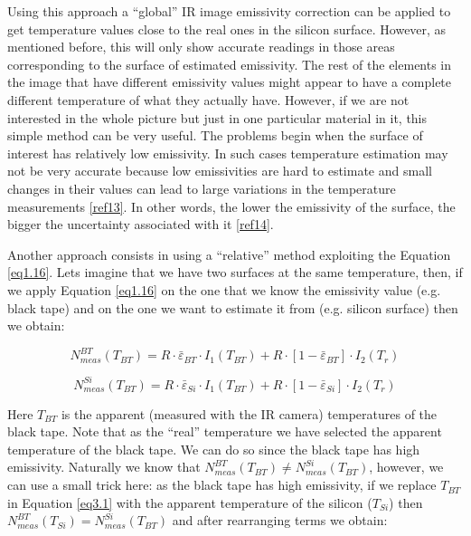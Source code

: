 		Using this approach a “global” IR image emissivity correction can be applied to get temperature values close to the real ones in the silicon surface. However, as mentioned before, this will only show accurate readings in those areas corresponding to the surface of estimated emissivity. The rest of the elements in the image that have different emissivity values might appear to have a complete different temperature of what they actually have. However, if we are not interested in the whole picture but just in one particular material in it, this simple method can be very useful. The problems begin when the surface of interest has relatively low emissivity. In such cases temperature estimation may not be very accurate because low emissivities are hard to estimate and small changes in their values can lead to large variations in the temperature measurements \ref{ref13}. In other words, the lower the emissivity of the surface, the bigger the uncertainty associated with it \ref{ref14}.
		
		Another approach consists in using a “relative” method exploiting the Equation \ref{eq1.16}. Lets imagine that we have two surfaces at the same temperature, then, if we apply Equation \ref{eq1.16} on the one that we know the emissivity value (e.g. black tape) and on the one we want to estimate it from (e.g. silicon surface) then we obtain:
		
		\begin{equation}\label{eq3.1}
			N^{BT}_{meas}(T_{BT})= R \cdot \bar{\varepsilon}_{BT} \cdot I_{1}(T_{BT}) + R \cdot [1- \bar{\varepsilon}_{BT}] \cdot I_{2}(T_{r})
		\end{equation}
			
		\begin{equation}\label{eq3.2}
			N^{Si}_{meas}(T_{BT})= R \cdot \bar{\varepsilon}_{Si} \cdot I_{1}(T_{BT}) + R \cdot [1- \bar{\varepsilon}_{Si}] \cdot I_{2}(T_{r})
		\end{equation}\bigskip
	
		Here $T_{BT}$ is the apparent (measured with the IR camera) temperatures of the black tape. Note that as the “real” temperature we have selected the apparent temperature of the black tape. We can do so since the black tape has high emissivity. Naturally we know that $N^{BT}_{meas}(T_{BT}) \neq N^{Si}_{meas}(T_{BT})$, however, we can use a small trick here: as the black tape has high emissivity, if we replace $T_{BT}$ in Equation \ref{eq3.1} with the apparent temperature of the silicon ($T_{Si}$) then $N^{BT}_{meas}(T_{Si}) = N^{Si}_{meas}(T_{BT})$ and after rearranging terms we obtain:
		
